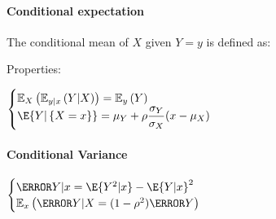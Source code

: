 \paragraph{Conditional expectation}
The conditional mean of $X$ given $Y=y$ is defined as:
\begin{center}
\end{center}

Properties:
\begin{center}
	$\begin{cases}
        \mathbb{E}_{X}\left(\mathbb{E}_{y|x}\left(Y|X\right)\right)=
        \mathbb{E}_{y}\left(Y\right)\\
	\E{Y|\left\{ X=x \right\}}=\mu_{Y}+\rho\dfrac{\sigma_{Y}}{\sigma_{X}}(x-\mu_{X})
	\end{cases}$	
\end{center}


\paragraph{Conditional Variance}
\begin{center}
	$\begin{cases}
	\V{Y|x}=\E{Y^{2}|x}-\E{Y|x}^{2}\\
	\mathbb{E}_{x}\left( \V{Y|X}=(1-\rho^{2})\V{Y} \right)
	\end{cases}$
\end{center}
